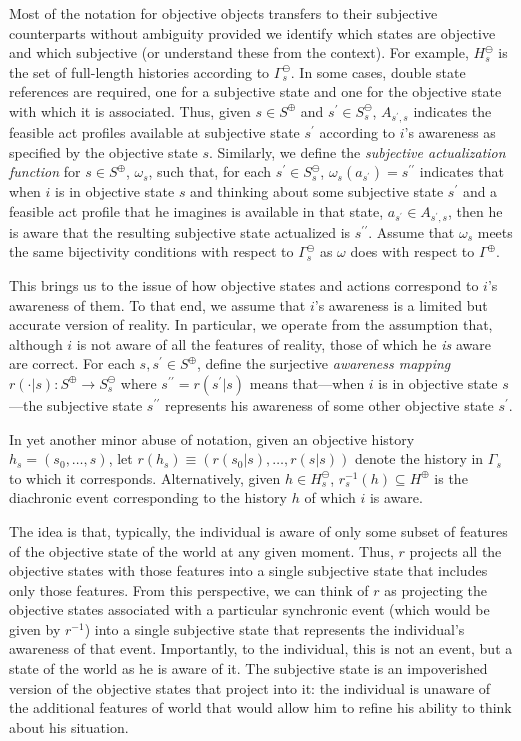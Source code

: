\documentclass[
11pt,
titlepage,
reqno,
]{article}%
\theoremstyle{definition}
\begin{document}
Most of the notation for objective objects transfers to their subjective counterparts without ambiguity provided we identify which states are objective and which subjective (or understand these from the context).
For example, $H^\ominus_s$ is the set of full-length histories according to $\Gamma^\ominus_s$.
In some cases, double state references are required, one for a subjective state and one for the objective state with which it is associated.
Thus, given $s\in S^\oplus$ and $s^\prime\in S^\ominus_s$, $A_{s^\prime,s}$ indicates the feasible act profiles available at subjective state $s^\prime$ according to $i$'s awareness as specified by the objective state $s$.
Similarly, we define the \textit{subjective actualization function} for $s\in S^\oplus$, $\omega_s$, such that, for each $s^\prime\in S^\ominus_s$, $\omega_s(a_{s^\prime})=s^{\prime\prime}$ indicates that when $i$  is in objective state $s$ and thinking about some subjective state $s^\prime$ and a feasible act profile that he imagines is available in that state, $a_{s^\prime}\in A_{s^\prime,s}$, then he is aware that the resulting subjective state actualized is $s^{\prime\prime}$.
Assume that $\omega_s$ meets the same bijectivity conditions with respect to $\Gamma^\ominus_s$ as $\omega$ does with respect to $\Gamma^\oplus$.
	
This brings us to the issue of how objective states and actions correspond to $i$'s awareness of them.
To that end, we assume that $i$'s awareness is a limited but accurate version of reality.
In particular, we  operate from the assumption that, although $i$ is not aware of all the features of reality,  those of which he \textit{is} aware are correct.  	
For each $s,s^\prime\in S^\oplus$, define the surjective \textit{awareness mapping} $r(\cdot|s):S^\oplus\rightarrow S^\ominus_s$ where $s^{\prime\prime}=r(s^\prime|s)$ means that---when $i$ is in objective state $s$---the subjective state $s^{\prime\prime}$  represents his awareness of some other objective state $s^\prime$.

In yet another minor abuse of notation, given an objective history $h_s=(s_0,\ldots,s)$, let $r(h_s)\equiv(r(s_0|s),\ldots,r(s|s))$ denote the history in $\Gamma_s$ to which it corresponds.
Alternatively, given $h\in H^\ominus_s$, $r^{-1}_s(h)\subseteq H^\oplus$ is the diachronic event corresponding to the history $h$ of which $i$ is aware.

The idea is that, typically, the individual is aware of only some subset of features of the objective state of the world at any given moment.
Thus, $r$ projects all the objective states with those features into a single subjective state that includes only those features.
From this perspective, we can think of $r$ as projecting the objective states associated with a particular synchronic event (which would be given by $r^{-1}$) into a single subjective state that represents the individual's awareness of that event.
Importantly, to the individual, this is not an event, but a state of the world as he is aware of it.
The subjective state is an impoverished version of the objective states that project into it: the individual is unaware of the additional features of world that would allow him to refine his ability to think about his situation.
\end{document}
